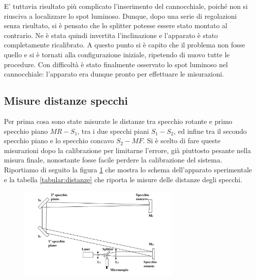 \documentclass{article}
\begin{document}
            E' tuttavia risultato più complicato l'inserimento del cannocchiale, poiché non si riusciva a localizzare lo spot luminoso. 
            Dunque, dopo una serie  di regolazioni senza risultato, si è pensato che lo splitter potesse essere stato montato al contrario. 
            Ne è stata quindi invertita l'inclinazione e l'apparato è stato completamente ricalibrato. 
            A questo punto si è capito che il problema non fosse quello e si è tornati alla configurazione iniziale, ripetendo di nuovo tutte le procedure. 
            Con difficoltà è stato finalmente osservato lo spot luminoso nel cannocchiale: l'apparato era dunque pronto per effettuare le misurazioni. 
        

        \subsection{Misure distanze specchi}

            Per prima cosa sono state misurate le distanze tra specchio rotante e primo specchio piano $MR-S_1$, tra i due specchi piani $S_1-S_2$, 
            ed infine tra il secondo specchio piano e lo specchio concavo $S_2-MF$. 
            Si è scelto di fare queste misurazioni dopo la calibrazione per limitarne l'errore, già piuttosto pesante nella misura finale, 
            nonostante fosse facile perdere la calibrazione del sistema. \\
            Riportiamo di seguito la figura \ref{fig:apparato} che mostra lo schema dell'apparato sperimentale e 
            la tabella \ref{tabular:distanze} che riporta le misure delle distanze degli specchi. \\

            \begin{figure}[H]

                \centering
                \includegraphics[width=8cm]{../images/apparato.png}

                \label{fig:apparato}
                
            \end{figure}
\end{document}
